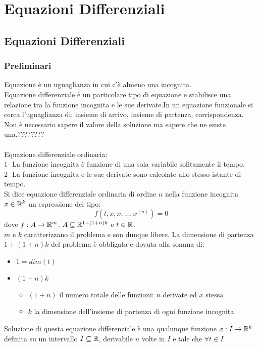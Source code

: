 \part{Equazioni Differenziali}
\chapter{Equazioni Differenziali}
\section{Preliminari}
Equazione è un uguaglianza in cui c'è almeno una incognita.\\
Equazione differenziale è un particolare tipo di equazione e stabilisce una relazione tra la funzione incognita e le sue derivate.In un equazione funzionale si cerca l'uguaglianza di: insieme di arrivo, insieme di partenza, corrispondenza.\\
Non è necessario sapere il valore della soluzione ma sapere che ne esiste una.????????\\\\
Equazione differenziale ordinaria:\\
1- La funzione incognita è funzione di una sola variabile solitamente il tempo.\\
2- La funzione incognita e le sue derivate sono calcolate allo stesso istante di tempo.\\
Si dice equazione differenziale ordinaria di ordine $n$ nella funzione incognita $x\in \mathbb{R}^k$ un espressione del tipo:
$$f(t,x,\overset{\cdot}{x},\ldots,x^{(n)})=0$$
dove $f:A\to \mathbb{R}^m$, $A\subseteq \mathbb{R}^{1+(1+n)k}$ e $t\in \mathbb{R}$.\\
$m$ e $k$ caratterizzano il problema e son dunque libere. La dimensione di partenza $1+(1+n)k$ del problema è obbligata e dovuta alla somma di:
\begin{itemize}
	\item $1 = dim(t)$
	\item $(1+n)k$
	\begin{itemize}
		\item $(1+n)$ il numero totale delle funzioni: $n$ derivate ed $x$ stessa
		\item $k$ la dimensione dell'insieme di partenza di ogni funzione incognita
	\end{itemize}
\end{itemize}
Soluzione di questa equazione differenziale è una qualunque funzione $x:I\to \mathbb{R}^k$ definita su un intervallo $I\subseteq \mathbb{R}$, derivabile $n$ volte in $I$ e tale che $\forall t\in I$\\
